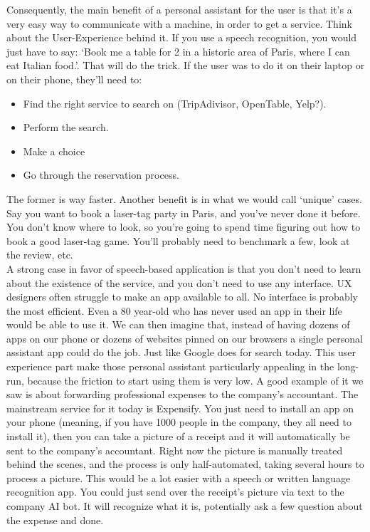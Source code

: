 \documentclass[12pt]{article}
\begin{document}
Consequently, the main benefit of a personal assistant for the user is that it's a very easy way to
communicate with a machine, in order to get a service. Think about the
User-Experience behind it. If you use a speech recognition, you would just
have to say: \lq Book me a table for 2 in a historic area of Paris, where I
can eat Italian
food.\rq. That will do the trick.
If the user was to do it on their laptop or on their phone, they'll need to:
\begin{itemize}
  \item Find the right service to search on (TripAdivisor, OpenTable, Yelp?).
  \item Perform the search.
  \item Make a choice
  \item Go through the reservation process.
\end{itemize}

The former is way faster. Another benefit is in what we would call \lq unique\rq
cases. Say you want to book a laser-tag party in Paris, and you've never done it
before. You don't know where to look, so you're going to spend time figuring out
how to book a good laser-tag game. You'll probably need to benchmark a few,
look at the review, etc.\\

A strong case in favor of speech-based application is that you don't need to
learn about the existence of the service, and you don't need to use any
interface. UX designers often struggle to make an app available to all. No
interface is probably the most efficient. Even a 80 year-old who has never used
an app in their life would be able to use it. We can then imagine that, instead
of having dozens of apps on our phone or dozens of websites pinned on our
browsers a single personal assistant app could do the job. Just like Google
does for search today. This user experience part make those personal assistant
particularly appealing in the long-run, because the friction to start using them
is very low. A good example of it we saw is about forwarding professional
expenses to the company's accountant. The mainstream service for it today is
Expensify. You just need to install an app on your phone (meaning, if you have
1000 people in the company, they all need to install it), then you can take a
picture of a receipt and it will automatically be sent to the company's
accountant. Right now the picture is manually treated behind the scenes, and the
process is only half-automated, taking several hours to process a picture.
This would be a lot easier with a speech or written language
recognition app. You could just send over the receipt's picture via text to the
company AI bot. It will recognize what it is, potentially ask a few question
about the expense and done.
\end{document}
